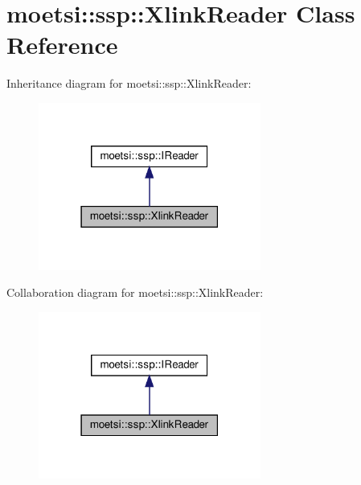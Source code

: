 \hypertarget{classmoetsi_1_1ssp_1_1XlinkReader}{}\section{moetsi\+:\+:ssp\+:\+:Xlink\+Reader Class Reference}
\label{classmoetsi_1_1ssp_1_1XlinkReader}


Inheritance diagram for moetsi\+:\+:ssp\+:\+:Xlink\+Reader\+:
\nopagebreak
\begin{figure}[H]
\begin{center}
\leavevmode
\includegraphics[width=207pt]{classmoetsi_1_1ssp_1_1XlinkReader__inherit__graph}
\end{center}
\end{figure}


Collaboration diagram for moetsi\+:\+:ssp\+:\+:Xlink\+Reader\+:
\nopagebreak
\begin{figure}[H]
\begin{center}
\leavevmode
\includegraphics[width=207pt]{classmoetsi_1_1ssp_1_1XlinkReader__coll__graph}
\end{center}
\end{figure}

